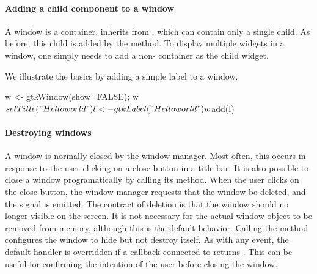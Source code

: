 \paragraph{Adding a child component to a window}
A window is a container.  inherits from
, which can contain only a single child. As before, this
child is added by the  method. To display
multiple widgets in a window, one simply needs to add a
non- container as the child widget.

We illustrate the basics by adding a simple label to a window.
\begin{Schunk}
\begin{Sinput}
 w <- gtkWindow(show=FALSE); w$setTitle("Hello world")
 l <- gtkLabel("Hello world")
 w$add(l)
\end{Sinput}
\end{Schunk}
%

\paragraph{Destroying windows}
A window is normally closed by the window manager. Most often, this
occurs in response to the user clicking on a close button in a title
bar. It is also possible to close a window programatically by calling
its  method. When the user clicks on the
close button, the window manager requests that the window be deleted,
and the  signal is emitted.  The contract of
deletion is that the window should no longer visible on the screen. It
is not necessary for the actual window object to be removed from
memory, although this is the default behavior. Calling the
 method configures the window to hide but not
destroy itself. As with any event, the default handler is overridden
if a callback connected to  returns .
This can be useful for confirming the intention of the user before
closing the window.

